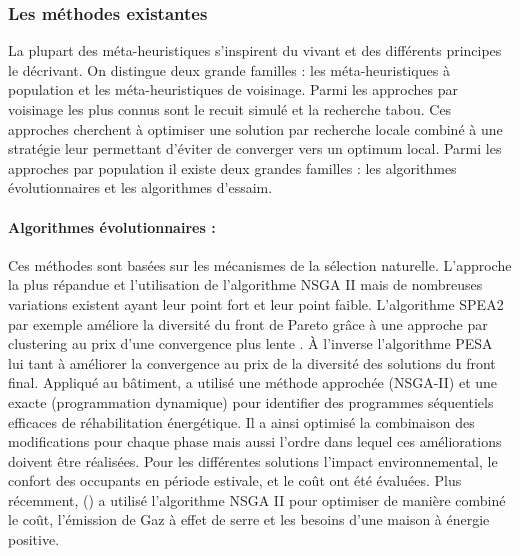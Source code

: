 \subsubsection{Les méthodes existantes} %
\label{ssub:les_methodes_existantes}
La plupart des méta-heuristiques s’inspirent du vivant et des différents principes
le décrivant. On distingue deux grande familles : les méta-heuristiques à population
et les méta-heuristiques de voisinage. Parmi les approches par voisinage les plus
connus sont le recuit simulé et la recherche tabou. Ces approches cherchent à optimiser
une solution par recherche locale combiné à une stratégie leur permettant d’éviter
de converger vers un optimum local. Parmi les approches par population il existe
deux grandes familles : les algorithmes évolutionnaires et les algorithmes d’essaim.

\paragraph{Algorithmes évolutionnaires :} %
\label{par:algorithmes_évolutionnaires}
Ces méthodes sont basées sur les mécanismes de la sélection naturelle. L’approche la plus
répandue et l’utilisation de l’algorithme NSGA II \parencite{Deb2002182} mais de nombreuses
variations existent ayant leur point fort et leur point faible. L’algorithme
SPEA2 par exemple améliore la diversité du front de Pareto grâce à une approche par
clustering au prix d’une convergence plus lente \parencite{Zitzler2001}. À l’inverse
l’algorithme PESA lui tant à améliorer la convergence au prix de la diversité des
solutions du front final. Appliqué au bâtiment, \cite{Rivallain2013}
a utilisé une méthode approchée (NSGA-II) et une exacte (programmation dynamique)
pour identifier des programmes séquentiels efficaces de réhabilitation énergétique.
Il a ainsi optimisé la combinaison des modifications pour chaque phase mais aussi l’ordre
dans lequel ces améliorations doivent être réalisées.
Pour les différentes solutions l’impact environnemental, le confort des occupants en
période estivale, et le coût ont été évaluées.
Plus récemment, () a utilisé l’algorithme NSGA II pour
optimiser de manière combiné le coût, l’émission de Gaz à effet de serre et
les besoins d’une maison à énergie positive.

